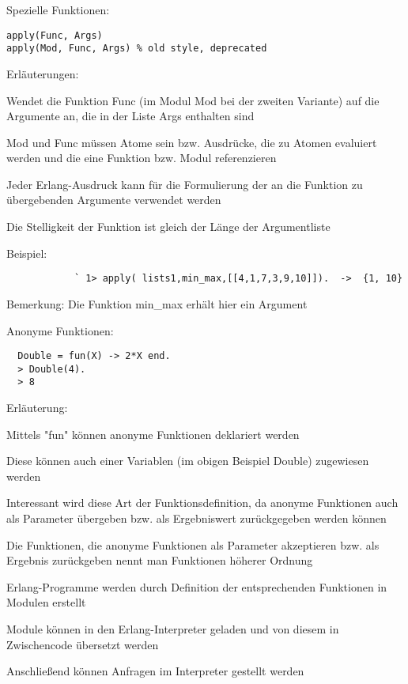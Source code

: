 \documentclass[10pt]{article}
\begin{document}
\begin{itemize*}
Spezielle Funktionen:
\begin{lstlisting}
apply(Func, Args)
apply(Mod, Func, Args) % old style, deprecated
\end{lstlisting}
\begin{itemize*}
  \item Erläuterungen:
  \item Wendet die Funktion Func (im Modul Mod bei der zweiten Variante) auf die Argumente an, die in der Liste Args enthalten sind
  \item Mod und Func müssen Atome sein bzw. Ausdrücke, die zu Atomen evaluiert werden und die eine Funktion bzw. Modul referenzieren
  \item Jeder Erlang-Ausdruck kann für die Formulierung der an die Funktion zu übergebenden Argumente verwendet werden
  \item Die Stelligkeit der Funktion ist gleich der Länge der Argumentliste
  \item Beispiel:
  \begin{lstlisting}
            ` 1> apply( lists1,min_max,[[4,1,7,3,9,10]]).  ->  {1, 10}
          \end{lstlisting}
  \item Bemerkung: Die Funktion min\_max erhält hier ein Argument
\end{itemize*}

Anonyme Funktionen:
\begin{lstlisting}
  Double = fun(X) -> 2*X end.
  > Double(4).
  > 8
\end{lstlisting}
\begin{itemize*}
  \item Erläuterung:
  \item Mittels "fun" können anonyme Funktionen deklariert werden
  \item Diese können auch einer Variablen (im obigen Beispiel Double) zugewiesen werden
  \item Interessant wird diese Art der Funktionsdefinition, da anonyme Funktionen auch als Parameter übergeben bzw. als Ergebniswert zurückgegeben werden können
  \item Die Funktionen, die anonyme Funktionen als Parameter akzeptieren bzw. als Ergebnis zurückgeben nennt man Funktionen höherer Ordnung
\end{itemize*}

\begin{itemize*}
  \item Erlang-Programme werden durch Definition der entsprechenden Funktionen in Modulen erstellt
  \item Module können in den Erlang-Interpreter geladen und von diesem in Zwischencode übersetzt werden
  \item Anschließend können Anfragen im Interpreter gestellt werden
\end{itemize*}


\end{itemize*}
\end{document}
